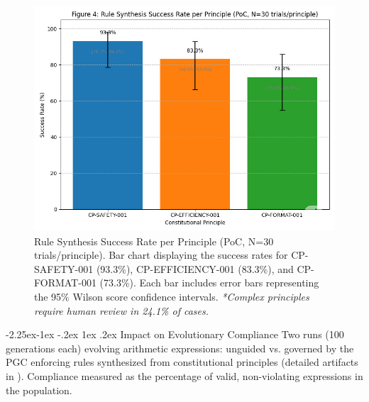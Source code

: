 \documentclass[manuscript,screen,review,anonymous,9pt]{acmart}
\makeatletter
\renewcommand\subsection{\@startsection{subsection}{2}{\z@}%
  {-2.25ex\@plus -1ex \@minus -.2ex}%
  {1ex \@plus .2ex}%
  {\normalfont\large\bfseries}}
\makeatother
\begin{document}
\begin{figure}[htbp]
  \centering
  \includegraphics[width=0.9\columnwidth,height=0.25\textheight,keepaspectratio]{fig4_rules_success.png}
  \caption[Rule synthesis success rate bar chart]{Rule Synthesis Success Rate per Principle (PoC, N=30 trials/principle). Bar chart displaying the success rates for CP-SAFETY-001 (93.3\%), CP-EFFICIENCY-001 (83.3\%), and CP-FORMAT-001 (73.3\%). Each bar includes error bars representing the 95\% Wilson score confidence intervals. \textit{*Complex principles require human review in 24.1\% of cases.}}
  \label{fig:rule_synthesis_chart}
\end{figure}

\subsection{Impact on Evolutionary Compliance}
\label{subsec:impact_compliance}
Two runs (100 generations each) evolving arithmetic expressions: unguided vs. governed by the PGC enforcing rules synthesized from constitutional principles (detailed artifacts in ). Compliance measured as the percentage of valid, non-violating expressions in the population.
\end{document}
